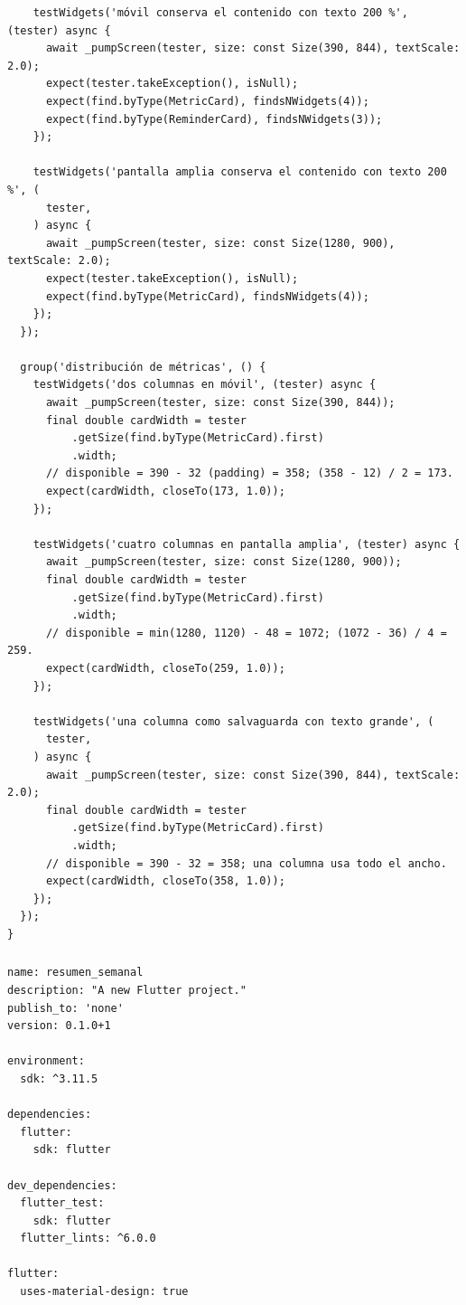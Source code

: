 \documentclass[12pt,a4paper]{article}
\newcommand{\codigo}[1]{\texttt{\detokenize{#1}}}
\begin{document}
\begin{lstlisting}
    testWidgets('móvil conserva el contenido con texto 200 %', (tester) async {
      await _pumpScreen(tester, size: const Size(390, 844), textScale: 2.0);
      expect(tester.takeException(), isNull);
      expect(find.byType(MetricCard), findsNWidgets(4));
      expect(find.byType(ReminderCard), findsNWidgets(3));
    });

    testWidgets('pantalla amplia conserva el contenido con texto 200 %', (
      tester,
    ) async {
      await _pumpScreen(tester, size: const Size(1280, 900), textScale: 2.0);
      expect(tester.takeException(), isNull);
      expect(find.byType(MetricCard), findsNWidgets(4));
    });
  });

  group('distribución de métricas', () {
    testWidgets('dos columnas en móvil', (tester) async {
      await _pumpScreen(tester, size: const Size(390, 844));
      final double cardWidth = tester
          .getSize(find.byType(MetricCard).first)
          .width;
      // disponible = 390 - 32 (padding) = 358; (358 - 12) / 2 = 173.
      expect(cardWidth, closeTo(173, 1.0));
    });

    testWidgets('cuatro columnas en pantalla amplia', (tester) async {
      await _pumpScreen(tester, size: const Size(1280, 900));
      final double cardWidth = tester
          .getSize(find.byType(MetricCard).first)
          .width;
      // disponible = min(1280, 1120) - 48 = 1072; (1072 - 36) / 4 = 259.
      expect(cardWidth, closeTo(259, 1.0));
    });

    testWidgets('una columna como salvaguarda con texto grande', (
      tester,
    ) async {
      await _pumpScreen(tester, size: const Size(390, 844), textScale: 2.0);
      final double cardWidth = tester
          .getSize(find.byType(MetricCard).first)
          .width;
      // disponible = 390 - 32 = 358; una columna usa todo el ancho.
      expect(cardWidth, closeTo(358, 1.0));
    });
  });
}

\end{lstlisting}

\subsubsection*{\codigo{pubspec.yaml}}
\begin{lstlisting}
name: resumen_semanal
description: "A new Flutter project."
publish_to: 'none'
version: 0.1.0+1

environment:
  sdk: ^3.11.5

dependencies:
  flutter:
    sdk: flutter

dev_dependencies:
  flutter_test:
    sdk: flutter
  flutter_lints: ^6.0.0

flutter:
  uses-material-design: true

\end{lstlisting}
\end{document}
